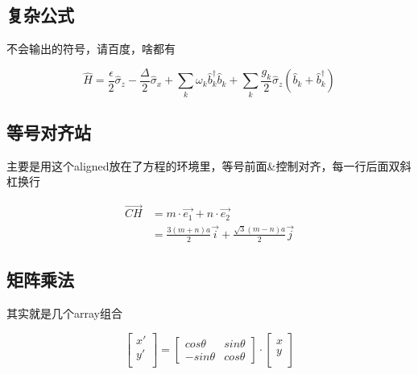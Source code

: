 \documentclass{LZUThesis}
\begin{document}

\subsection{复杂公式} %
\label{sub:复杂公式}
不会输出的符号，请百度，啥都有

\begin{equation}
\hat{H}=\frac{\epsilon}{2}\hat{\sigma}_{z}-\frac{\Delta}{2}\hat{\sigma}_{x}+\sum_{k}\omega_{k}\hat{b}_{k}^{\dagger}\hat{b}_{k}+\sum_{k}\frac{g_{k}}{2}\hat{\sigma}_{z}(\hat{b}_{k}+\hat{b}_{k}^{\dagger})\label{eq:sbm}
\end{equation}



\subsection{等号对齐站} %
\label{sub:等号对齐站}

主要是用这个aligned放在了方程的环境里，等号前面\&控制对齐，每一行后面双斜杠换行

\begin{equation}
    \begin{aligned}
        \vec{CH} & = m\cdot \vec{e_1} + n\cdot \vec{e_2} \\
        & = \frac{3(m+n)a}{2} \vec{i} + \frac{\sqrt{3}(m-n)a}{2} \vec{j} 
    \end{aligned}
    \label{ch}
\end{equation}


\subsection{矩阵乘法} %
\label{sub:矩阵乘法}

其实就是几个array组合

\begin{equation}
    \left[ 
    \begin{array}{c}
    x'\\
    y'\\
    \end{array}
    \right]=
    \left[ 
    \begin{array}{cc}
    cos \theta & sin \theta \\
    - sin \theta & cos \theta 
    \end{array}
    \right]
    \cdot
    \left[ 
    \begin{array}{c}
        x\\
        y\\
    \end{array}
    \right]
\end{equation}
\end{document}
